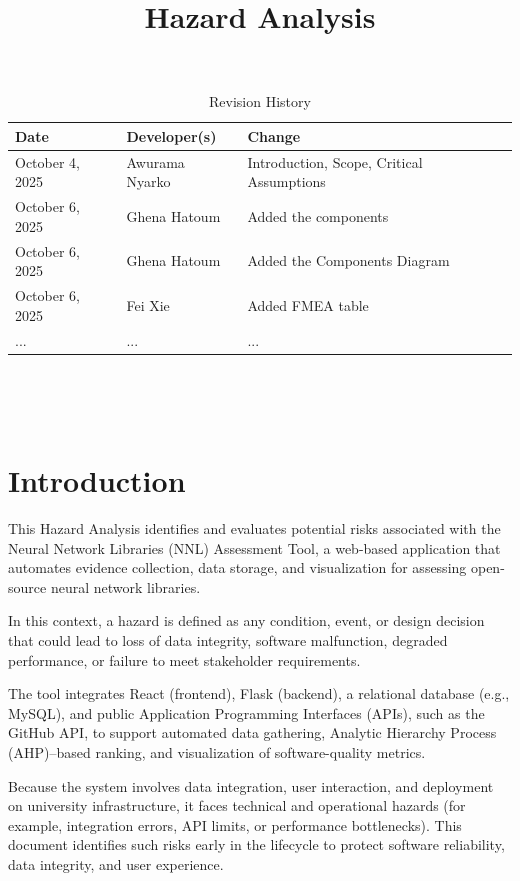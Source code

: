 \documentclass{article}
\title{Hazard Analysis\\\progname}
\author{\authname}
\date{}
\begin{document}
\maketitle
\thispagestyle{empty}


\begin{table}[hp]
\caption{Revision History} \label{TblRevisionHistory}
\begin{tabularx}{\textwidth}{llX}
\toprule
\textbf{Date} & \textbf{Developer(s)} & \textbf{Change}\\
\midrule
October 4, 2025 & Awurama Nyarko & Introduction, Scope, Critical Assumptions\\
October 6, 2025  & Ghena Hatoum & Added the components\\
October 6, 2025  & Ghena Hatoum & Added the Components Diagram\\
October 6, 2025 & Fei Xie & Added FMEA table\\
... & ... & ...\\
\bottomrule
\end{tabularx}
\end{table}

~\newpage

\tableofcontents

~\newpage


\section{Introduction}


This Hazard Analysis identifies and evaluates potential risks associated with
the Neural Network Libraries (NNL) Assessment Tool, a web-based application that
automates evidence collection, data storage, and visualization for assessing
open-source neural network libraries. 

In this context, a hazard is defined as any condition, event, or design
decision that could lead to loss of data integrity, software malfunction,
degraded performance, or failure to meet stakeholder requirements.

The tool integrates React (frontend), Flask (backend), a relational database
(e.g., MySQL), and public Application Programming Interfaces (APIs), such as the
GitHub API, to support automated data gathering, Analytic Hierarchy Process
(AHP)--based ranking, and visualization of software-quality metrics.

Because the system involves data integration, user interaction, and deployment
on university infrastructure, it faces technical and operational hazards (for
example, integration errors, API limits, or performance bottlenecks). This
document identifies such risks early in the lifecycle to protect software
reliability, data integrity, and user experience.
\end{document}
